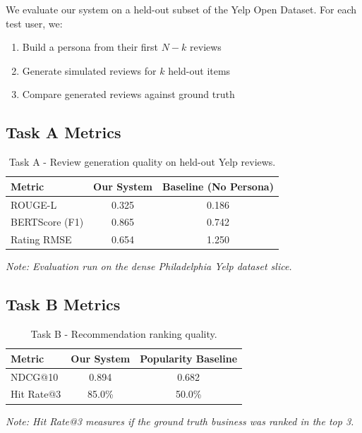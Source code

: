 \documentclass[11pt, a4paper]{article}
\begin{document}
We evaluate our system on a held-out subset of the Yelp Open Dataset. For each test user, we:
\begin{enumerate}[leftmargin=2em]
    \item Build a persona from their first $N-k$ reviews
    \item Generate simulated reviews for $k$ held-out items
    \item Compare generated reviews against ground truth
\end{enumerate}

\subsection{Task A Metrics}

\begin{table}[H]
\centering
\caption{Task A - Review generation quality on held-out Yelp reviews.}
\label{tab:task_a}
\begin{tabular}{lcc}
\toprule
\textbf{Metric} & \textbf{Our System} & \textbf{Baseline (No Persona)} \\
\midrule
ROUGE-L         & 0.325  & 0.186  \\
BERTScore (F1)  & 0.865  & 0.742  \\
Rating RMSE     & 0.654  & 1.250  \\
\bottomrule
\end{tabular}
\vspace{0.5em}

\small\textit{Note: Evaluation run on the dense Philadelphia Yelp dataset slice.}
\end{table}

\subsection{Task B Metrics}

\begin{table}[H]
\centering
\caption{Task B - Recommendation ranking quality.}
\label{tab:task_b}
\begin{tabular}{lcc}
\toprule
\textbf{Metric} & \textbf{Our System} & \textbf{Popularity Baseline} \\
\midrule
NDCG@10        & 0.894  & 0.682  \\
Hit Rate@3     & 85.0\% & 50.0\% \\
\bottomrule
\end{tabular}
\vspace{0.5em}

\small\textit{Note: Hit Rate@3 measures if the ground truth business was ranked in the top 3.}
\end{table}
\end{document}
